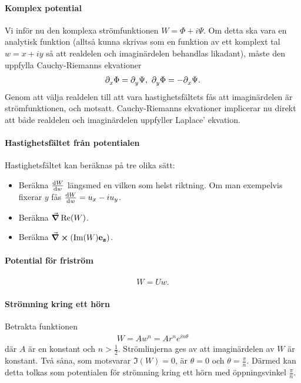 \paragraph{Komplex potential}
Vi inför nu den komplexa strömfunktionen $W = \Phi + i\Psi$. Om detta ska vara en analytisk funktion (alltså kunna skrivas som en funktion av ett komplext tal $w = x + iy$ så att realdelen och imaginärdelen behandlas likadant), måste den uppfylla Cauchy-Riemanns ekvationer
\begin{align*}
	\partial_{x}^{}\Phi = \partial_{y}^{}\Psi,\ \partial_{y}^{}\Phi = -\partial_{x}^{}\Psi.
\end{align*}
Genom att välja realdelen till att vara hastighetsfältets fås att imaginärdelen är strömfunktionen, och motsatt. Cauchy-Riemanns ekvationer implicerar nu direkt att både realdelen och imaginärdelen uppfyller Laplace' ekvation.

\paragraph{Hastighetsfältet från potentialen}
Hastighetsfältet kan beräknas på tre olika sätt:
\begin{itemize}
	\item Beräkna $\dv{W}{w}$ längsmed en vilken som helst riktning. Om man exempelvis fixerar $y$ fås $\dv{W}{w} = u_{x} - iu_{y}$.
	\item Beräkna $\grad{\Re(W)}$.
	\item Beräkna $\curl(\Im(W)\vb{e}_{\vb{z}})$.
\end{itemize}

\paragraph{Potential för friström}
\begin{align*}
	W = Uw.
\end{align*}

\paragraph{Strömning kring ett hörn}
Betrakta funktionen
\begin{align*}
	W = Aw^{n} = Ar^{n}e^{in\theta}
\end{align*}
där $A$ är en konstant och $n > \frac{1}{2}$. Strömlinjerna ges av att imaginärdelen av $W$ är konstant. Två såna, som motsvarar $\Im(W) = 0$, är $\theta = 0$ och $\theta = \frac{\pi}{n}$. Därmed kan detta tolkas som potentialen för strömning kring ett hörn med öppningsvinkel $\frac{\pi}{n}$.


